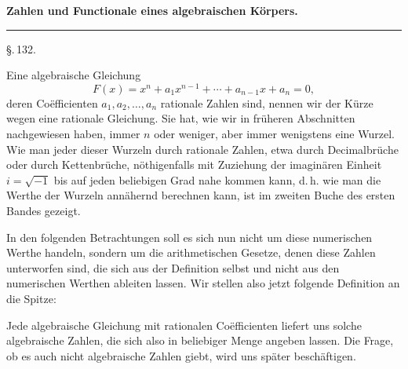 \begin{center}

\textbf{Zahlen und Functionale eines algebraischen K\"orpers.}

\rule{4cm}{0.4pt}
\end{center}

\begin{center}
\S.\,132.

\end{center}

Eine algebraische Gleichung
\[
F(x) = x^n + a_1 x^{n-1} + \cdots + a_{n-1} x + a_n = 0,
\]
deren Co\"efficienten $a_1, a_2, \ldots, a_n$ rationale Zahlen sind, nennen wir der K\"urze wegen eine rationale Gleichung. Sie hat, wie wir in fr\"uheren Abschnitten nachgewiesen haben, immer $n$ oder weniger, aber immer wenigstens eine Wurzel. Wie man jeder dieser Wurzeln durch rationale Zahlen, etwa durch Decimalbr\"uche oder durch Kettenbr\"uche, n\"othigenfalls mit Zuziehung der imagin\"aren Einheit $i = \sqrt{-1}$ bis auf jeden beliebigen Grad nahe kommen kann, d.\,h. wie man die Werthe der Wurzeln ann\"ahernd berechnen kann, ist im zweiten Buche des ersten Bandes gezeigt.

In den folgenden Betrachtungen soll es sich nun nicht um diese numerischen Werthe handeln, sondern um die arithmetischen Gesetze, denen diese Zahlen unterworfen sind, die sich aus der Definition selbst und nicht aus den numerischen Werthen ableiten lassen. Wir stellen also jetzt folgende Definition an die Spitze:


Jede algebraische Gleichung mit rationalen Co\"efficienten liefert uns solche algebraische Zahlen, die sich also in beliebiger Menge angeben lassen. Die Frage, ob es auch nicht algebraische Zahlen giebt, wird uns sp\"ater besch\"aftigen.
